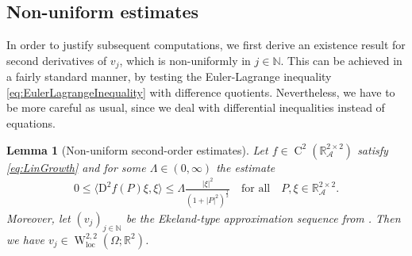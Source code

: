 \documentclass[a4paper,10pt,reqno,oneside]{amsart}
\numberwithin{equation}{section}
\newcommand{\R}{\mathbb R}
\newcommand{\N}{\mathbb N}
\newcommand{\A}{\mathscr{A}}
\newcommand{\sobo}{\operatorname{W}}
\newcommand{\cont}{\operatorname{C}}
\newcommand{\loc}{\mathrm{loc}}
\newcommand{\D}{\mathrm{D}}
\newcommand{\skalarProd}[2]{\big\langle#1,#2\big\rangle}
\newcommand{\abs}[1]{\left\lvert#1\right\rvert}
\newtheorem{lem}[thm]{Lemma}
\begin{document}
\subsection{Non-uniform estimates}

In order to justify subsequent computations, we first derive an existence result for second derivatives of $v_j$, which is non-uniformly in $j\in\N$. This can be achieved in a fairly standard manner, by testing the Euler-Lagrange inequality \eqref{eq:EulerLagrangeInequality} with difference quotients. Nevertheless, we have to be more careful as usual, since we deal with differential inequalities instead of equations. 

\begin{lem}[Non-uniform second-order estimates]\label{lem:NonUniformSecEstimates}
	Let $f\in\cont^2(\R^{2\times2}_\A)$ satisfy \eqref{eq:LinGrowth} and for some $\Lambda\in (0,\infty)$ the estimate 
	\begin{align}\label{eq:MuElliptic_UpperBound}
		0\leq\skalarProd{\D^2 f(P)\xi}{\xi}\leq \Lambda \frac{\abs{\xi}^2}{(1+\abs{P}^2)^\frac{1}{2}}\quad\mbox{for all}\quad P,\xi\in\R^{2\times 2}_\A. 
	\end{align}
Moreover, let  $(v_j)_{j\in\N}$ be the Ekeland-type approximation sequence from .  Then we have $v_j\in\sobo^{2,2}_\loc(\Omega;\R^2)$. 
\end{lem}
\end{document}
